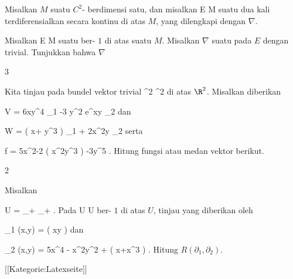 {}
{

Misalkan $M$ suatu
$C^2$-
berdimensi satu, dan misalkan
\maabb {} { E } { M
} {}
suatu
dua kali terdiferensialkan secara kontinu di atas $M$, yang dilengkapi dengan
$\nabla$.

}
{} {}

{}
{

Misalkan
\maabb {} { E } { M
} {}
suatu
ber-
$1$ di atas suatu
$M$. Misalkan $\nabla$ suatu
pada $E$ dengan
trivial. Tunjukkan bahwa $\nabla$

}
{} {}


{3}
{

Kita tinjau
pada bundel vektor trivial
\maabbdisp {} {\R^2 \times \R } { \R^2
} {}
di atas $\R^2$. Misalkan diberikan

\mavergleichskettedisp
{\vergleichskette
{ V
}
{ =} { 6xy^4 \partial_1 -3 y^2 e^{xy} \partial_2
}
{ } {
}
{ } {
}
{ } {
}
}
{}{}{}
dan

\mavergleichskettedisp
{\vergleichskette
{ W
}
{ =} { \left(  x+ y^3  \right)  \partial_1 + 2x^2y \partial_2
}
{ } {
}
{ } {
}
{ } {
}
}
{}{}{}
serta

\mavergleichskettedisp
{\vergleichskette
{ f
}
{ =} { 5x^2-2  \cos \left(  x^2y^3 \right) -3y^5
}
{ } {
}
{ } {
}
{ } {
}
}
{}{}{.}
Hitung fungsi atau medan vektor berikut.

}
{} {}

{2}
{

Misalkan

\mavergleichskette
{\vergleichskette
{ U
}
{ = }{ \R_+ \times \R_+
}
{  }{
}
{    }{
}
{   }{
}
}
{}{}{.}
Pada
 {U \times \R} { U
} {}
ber-
$1$ di atas $U$, tinjau
yang diberikan oleh

\mavergleichskette
{\vergleichskette
{ \Gamma_1 (x,y)
}
{ = }{ \ln  \left(  xy \right)
}
{  }{
}
{    }{
}
{   }{
}
}
{}{}{}
dan

\mavergleichskette
{\vergleichskette
{ \Gamma_2 (x,y)
}
{ = }{ 5x^4 - \cos  x^2y^2 +  \ln  \left(  x+x^3 \right)
}
{  }{
}
{    }{
}
{   }{
}
}
{}{}{.}
Hitung
$R \left(  \partial_1, \partial_2  \right)$.

}
{} {}

 [[Kategorie:Latexseite]]
